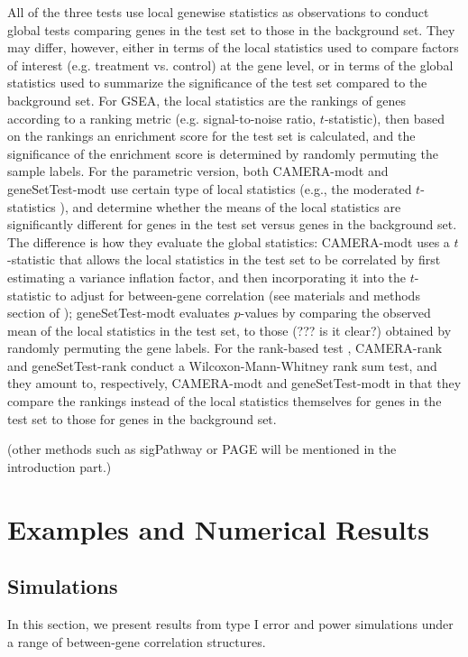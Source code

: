 \documentclass[11pt, a4paper]{article}
\begin{document}
	All of the three tests use local genewise statistics as observations to conduct global tests comparing genes in the test set to those in the background set. They may differ, however, either in terms of the local statistics used to compare factors of interest (e.g. treatment vs. control) at the gene level, or in terms of the global statistics used to summarize the significance of the test set compared to the background set. For GSEA, the local statistics are the rankings of genes according to a ranking metric (e.g. signal-to-noise ratio, $t$-statistic), then based on the rankings an enrichment score for the test set is calculated, and the significance of the enrichment score is determined by randomly permuting the sample labels. For the parametric version, both CAMERA-modt and geneSetTest-modt use certain type of local statistics (e.g., the moderated $t$-statistics \cite{Smyth2004moderated}), and determine whether the means of the local statistics are significantly different for genes in the test set versus genes in the background set. The difference is how they evaluate the global statistics: CAMERA-modt uses a $t$-statistic   that allows the local statistics in the test set to be correlated by first estimating a variance inflation factor, and then incorporating it into the $t$-statistic to adjust for between-gene correlation (see materials and methods section of \cite{wu2012camera}); geneSetTest-modt evaluates $p$-values by comparing the observed mean of the local statistics in the test set, to those (??? is it clear?) obtained by randomly permuting the gene labels. For the rank-based test , CAMERA-rank and geneSetTest-rank conduct a Wilcoxon-Mann-Whitney rank sum test, and they amount to, respectively,  CAMERA-modt and geneSetTest-modt in that they compare the rankings instead of the local statistics themselves for genes in the test set to those for genes in the background set. 
	
	(other methods such as sigPathway or PAGE will be mentioned in the introduction part.)

	
	\section{Examples and Numerical Results}\label{section:results}

	\subsection{Simulations}\label{subsection:simulation}
		In this section, we present results from type I error and power simulations under a range of between-gene correlation structures.
		
\end{document}
